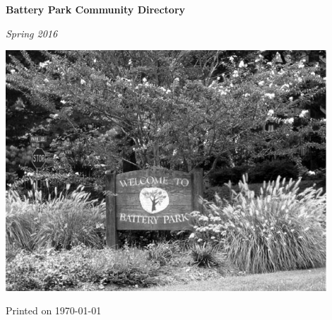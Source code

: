 \begin{titlepage}
	\centering
	{\Huge\bfseries Battery Park Community Directory\par}
	\vspace{2cm}
	{\huge\itshape Spring 2016\par}
	\includegraphics[width=0.9\textwidth]{Welcome.png}\par\vspace{1cm}
	\vfill

	{Printed on \today}
\end{titlepage}

